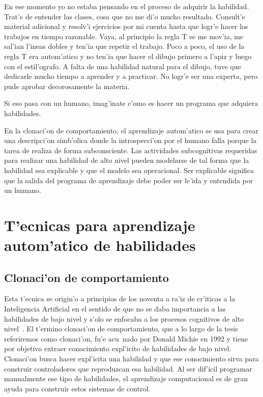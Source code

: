 \documentclass[11pt]{article}
\begin{document}
\medskip
En ese momento yo no estaba pensando en el proceso de adquirir la habilidad. Trat'e de entender las clases, cosa que no me di'o mucho resultado. Consult'e material adicional y resolv'i ejercicios por mi cuenta hasta que logr'e hacer los trabajos en tiempo razonable. Vaya, al principio la regla T se me mov'ia, me sal'ian l'ineas dobles y ten'ia que repetir el trabajo. Poco a poco, el uso de la regla T era autom'atico y no ten'ia que hacer el dibujo primero a l'apiz y luego con el estil'ografo. A falta de una habilidad natural para el dibujo, tuve que dedicarle mucho tiempo a aprender y a practicar. No logr'e ser una experta, pero pude aprobar decorosamente la materia. 

\medskip
Si eso pasa con un humano, imag'inate c'omo es hacer un programa que adquiera habilidades.

\medskip
En la clonaci'on de comportamiento, el aprendizaje autom'atico se usa para crear una descripci'on simb'olica donde la introspecci'on por el humano falla porque la tarea de realiza de forma subconsciente. Las actividades subcognitivas requeridas para realizar una habilidad de alto nivel pueden modelarse de tal forma que la habilidad sea explicable y que el modelo sea operacional. Ser explicable significa que la salida del programa de aprendizaje debe poder ser le'ida y entendida por un humano.

\section {T'ecnicas para aprendizaje autom'atico de habilidades}

\subsection{Clonaci'on de comportamiento}

Esta t'ecnica se origin'o a principios de los noventa a ra'iz de cr'iticas a la Inteligencia Artificial en el sentido de que no se daba importancia a las habilidades de bajo nivel y s'olo se enfocaba a los procesos cognitivos de alto nivel~\cite{michiesammut:cloning}. El t'ermino \textsf{clonaci'on de comportamiento}, que a lo largo de la tesis referiremos como \textsf{clonaci'on}, fu'e acu~nado por Donald Michie en 1992 y tiene por objetivo extraer conocimiento expl'icito de habilidades de bajo nivel. \textsf{Clonaci'on} busca hacer expl'icita una habilidad y que ese conocimiento sirva para construir controladores que reproduzcan esa habilidad. Al ser dif'icil programar manualmente ese tipo de habilidades, el aprendizaje computacional es de gran ayuda para construir estos sistemas de control.
\end{document}
